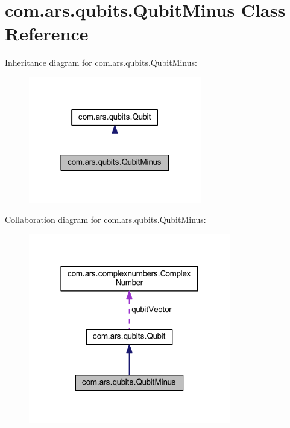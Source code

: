 \hypertarget{classcom_1_1ars_1_1qubits_1_1_qubit_minus}{}\section{com.\+ars.\+qubits.\+Qubit\+Minus Class Reference}
\label{classcom_1_1ars_1_1qubits_1_1_qubit_minus}


Inheritance diagram for com.\+ars.\+qubits.\+Qubit\+Minus\+:\nopagebreak
\begin{figure}[H]
\begin{center}
\leavevmode
\includegraphics[width=214pt]{classcom_1_1ars_1_1qubits_1_1_qubit_minus__inherit__graph}
\end{center}
\end{figure}


Collaboration diagram for com.\+ars.\+qubits.\+Qubit\+Minus\+:\nopagebreak
\begin{figure}[H]
\begin{center}
\leavevmode
\includegraphics[width=250pt]{classcom_1_1ars_1_1qubits_1_1_qubit_minus__coll__graph}
\end{center}
\end{figure}
